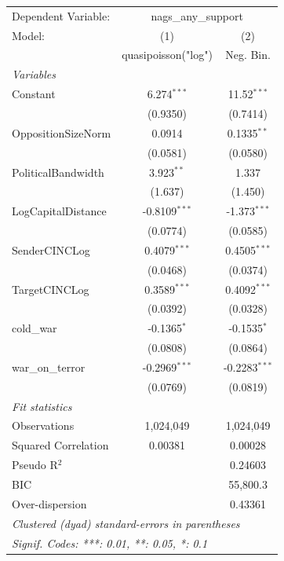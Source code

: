 
\begingroup
\centering
\begin{tabular}{lcc}
   \tabularnewline \midrule \midrule
   Dependent Variable: & \multicolumn{2}{c}{nags\_any\_support}\\
   Model:              & (1)                  & (2)\\  
                       &  quasipoisson("log") & Neg. Bin.\\  
   \midrule
   \emph{Variables}\\
   Constant            & 6.274$^{***}$        & 11.52$^{***}$\\   
                       & (0.9350)             & (0.7414)\\   
   OppositionSizeNorm  & 0.0914               & 0.1335$^{**}$\\   
                       & (0.0581)             & (0.0580)\\   
   PoliticalBandwidth  & 3.923$^{**}$         & 1.337\\   
                       & (1.637)              & (1.450)\\   
   LogCapitalDistance  & -0.8109$^{***}$      & -1.373$^{***}$\\   
                       & (0.0774)             & (0.0585)\\   
   SenderCINCLog       & 0.4079$^{***}$       & 0.4505$^{***}$\\   
                       & (0.0468)             & (0.0374)\\   
   TargetCINCLog       & 0.3589$^{***}$       & 0.4092$^{***}$\\   
                       & (0.0392)             & (0.0328)\\   
   cold\_war           & -0.1365$^{*}$        & -0.1535$^{*}$\\   
                       & (0.0808)             & (0.0864)\\   
   war\_on\_terror     & -0.2969$^{***}$      & -0.2283$^{***}$\\   
                       & (0.0769)             & (0.0819)\\   
   \midrule
   \emph{Fit statistics}\\
   Observations        & 1,024,049            & 1,024,049\\  
   Squared Correlation & 0.00381              & 0.00028\\  
   Pseudo R$^2$        &                      & 0.24603\\  
   BIC                 &                      & 55,800.3\\  
   Over-dispersion     &                      & 0.43361\\  
   \midrule \midrule
   \multicolumn{3}{l}{\emph{Clustered (dyad) standard-errors in parentheses}}\\
   \multicolumn{3}{l}{\emph{Signif. Codes: ***: 0.01, **: 0.05, *: 0.1}}\\
\end{tabular}
\par\endgroup


